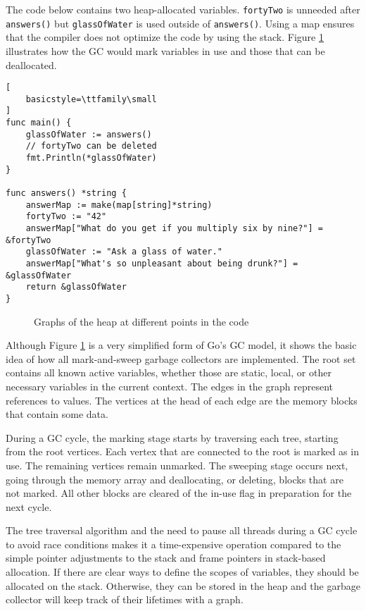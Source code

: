 \documentclass[11pt, letterpaper]{report}
\begin{document}
The code below contains two heap-allocated variables. \lstinline{fortyTwo} is unneeded after \lstinline{answers()} but \lstinline{glassOfWater} is used outside of \lstinline{answers()}. Using a map ensures that the compiler does not optimize the code by using the stack. Figure \ref{heap_graph} illustrates how the GC would mark variables in use and those that can be deallocated.

\begin{lstlisting}[
    basicstyle=\ttfamily\small
]
func main() {
	glassOfWater := answers()
	// fortyTwo can be deleted
	fmt.Println(*glassOfWater)
}

func answers() *string {
	answerMap := make(map[string]*string)
	fortyTwo := "42"
	answerMap["What do you get if you multiply six by nine?"] = &fortyTwo
	glassOfWater := "Ask a glass of water."
	answerMap["What's so unpleasant about being drunk?"] = &glassOfWater
	return &glassOfWater
}
\end{lstlisting}

\begin{figure}[htb!]
    \centering
    
    \caption{Graphs of the heap at different points in the code}
    \label{heap_graph}
\end{figure}

Although Figure \ref{heap_graph} is a very simplified form of Go's GC model, it shows the basic idea of how all mark-and-sweep garbage collectors are implemented. \cite{golang.org} The root set contains all known active variables, whether those are static, local, or other necessary variables in the current context. \cite{dynatrace.com} The edges in the graph represent references to values. The vertices at the head of each edge are the memory blocks that contain some data.

During a GC cycle, the marking stage starts by traversing each tree, starting from the root vertices. Each vertex that are connected to the root is marked as in use. The remaining vertices remain unmarked. The sweeping stage occurs next, going through the memory array and deallocating, or deleting, blocks that are not marked. All other blocks are cleared of the in-use flag in preparation for the next cycle. \cite{geeksforgeeks.org}

The tree traversal algorithm and the need to pause all threads during a GC cycle to avoid race conditions makes it a time-expensive operation compared to the simple pointer adjustments to the stack and frame pointers in stack-based allocation. If there are clear ways to define the scopes of variables, they should be allocated on the stack. Otherwise, they can be stored in the heap and the garbage collector will keep track of their lifetimes with a graph.

\printbibliography
\end{document}
